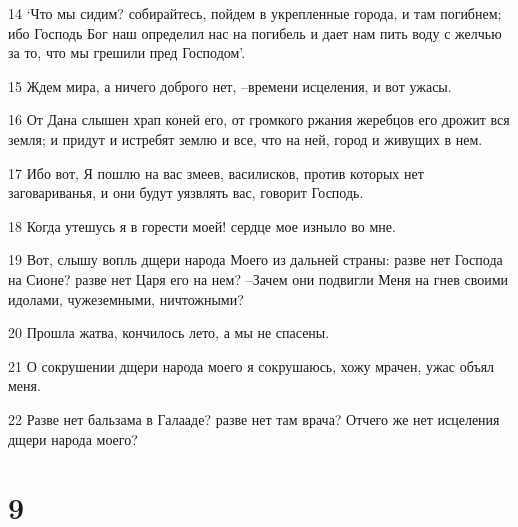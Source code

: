 \par 14 `Что мы сидим? собирайтесь, пойдем в укрепленные города, и там погибнем; ибо Господь Бог наш определил нас на погибель и дает нам пить воду с желчью за то, что мы грешили пред Господом'.
\par 15 Ждем мира, а ничего доброго нет, --времени исцеления, и вот ужасы.
\par 16 От Дана слышен храп коней его, от громкого ржания жеребцов его дрожит вся земля; и придут и истребят землю и все, что на ней, город и живущих в нем.
\par 17 Ибо вот, Я пошлю на вас змеев, василисков, против которых нет заговариванья, и они будут уязвлять вас, говорит Господь.
\par 18 Когда утешусь я в горести моей! сердце мое изныло во мне.
\par 19 Вот, слышу вопль дщери народа Моего из дальней страны: разве нет Господа на Сионе? разве нет Царя его на нем? --Зачем они подвигли Меня на гнев своими идолами, чужеземными, ничтожными?
\par 20 Прошла жатва, кончилось лето, а мы не спасены.
\par 21 О сокрушении дщери народа моего я сокрушаюсь, хожу мрачен, ужас объял меня.
\par 22 Разве нет бальзама в Галааде? разве нет там врача? Отчего же нет исцеления дщери народа моего?

\chapter{9}

